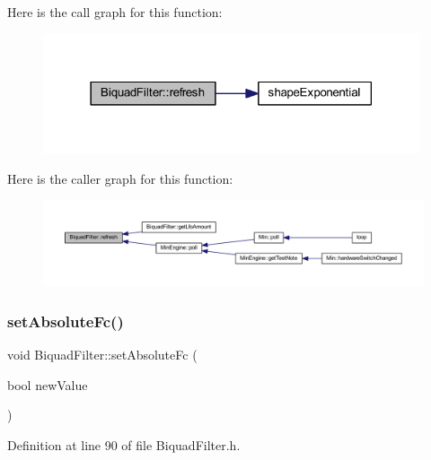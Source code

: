 Here is the call graph for this function\+:
\nopagebreak
\begin{figure}[H]
\begin{center}
\leavevmode
\includegraphics[width=314pt]{class_biquad_filter_a6b84cee1d3982596d90d3b1a74208b2a_cgraph}
\end{center}
\end{figure}
Here is the caller graph for this function\+:
\nopagebreak
\begin{figure}[H]
\begin{center}
\leavevmode
\includegraphics[width=350pt]{class_biquad_filter_a6b84cee1d3982596d90d3b1a74208b2a_icgraph}
\end{center}
\end{figure}
\mbox{\label{class_biquad_filter_aa557254793180f2714baee354be5b179}} 
\subsubsection{\texorpdfstring{set\+Absolute\+Fc()}{setAbsoluteFc()}}
{\footnotesize\ttfamily void Biquad\+Filter\+::set\+Absolute\+Fc (\begin{DoxyParamCaption}\item[{bool}]{new\+Value }\end{DoxyParamCaption})\hspace{0.3cm}{\ttfamily [inline]}}



Definition at line 90 of file Biquad\+Filter.\+h.

\mbox{\label{class_biquad_filter_a5bc855d79f31804b2fa8c4b7ef2fba3d}} 
